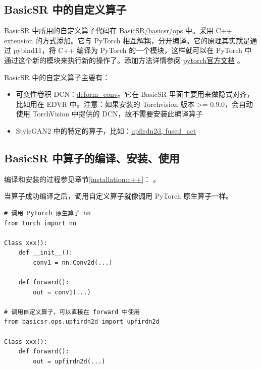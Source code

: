 \documentclass[../main.tex]{subfiles}
\begin{document}
\subsection{BasicSR 中的自定义算子}

BasicSR 中所用的自定义算子代码在 \href{https://github.com/XPixelGroup/BasicSR/tree/master/basicsr/ops}{BasicSR/basicsr/ops} 中。采用 C++ extension 的方式添加。它与 PyTorch 相互解耦，分开编译。它的原理其实就是通过 pybind11，将 C++ 编译为 PyTorch 的一个模块，这样就可以在 PyTorch 中通过这个新的模块来执行新的操作了。添加方法详情参阅 \href{https://pytorch.org/tutorials/advanced/cpp_extension.html#writing-a-mixed-c-cuda-extension}{pytorch官方文档} 。

BasicSR 中的自定义算子主要有：

\begin{itemize}
    \item 可变性卷积 DCN：\href{https://github.com/XPixelGroup/BasicSR/tree/master/basicsr/ops/dcn}{deform\_conv}。它在 BasicSR 里面主要用来做隐式对齐，比如用在 EDVR 中。注意：如果安装的 Torchvision 版本 >= 0.9.0，会自动使用 TorchVision 中提供的 DCN，故不需要安装此编译算子
    \item StyleGAN2 中的特定的算子，比如：\href{https://github.com/XPixelGroup/BasicSR/tree/master/basicsr/ops}{upfirdn2d, fused\_act}
\end{itemize}

\subsection{BasicSR 中算子的编译、安装、使用}

\begin{note} %
    编译和安装的过程参见章节\ref{installation:c++}： \label{installation:c++}。
\end{note}

当算子成功编译之后，调用自定义算子就像调用 PyTorch 原生算子一样。


\begin{verbatim}
# 调用 PyTorch 原生算子 nn
from torch import nn

Class xxx():
    def __init__():
        conv1 = nn.Conv2d(...)

    def forward():
        out = conv1(...)

# 调用自定义算子，可以直接在 forward 中使用
from basicsr.ops.upfirdn2d import upfirdn2d

Class xxx():
    def forward():
        out = upfirdn2d(...)

\end{verbatim}
\end{document}
